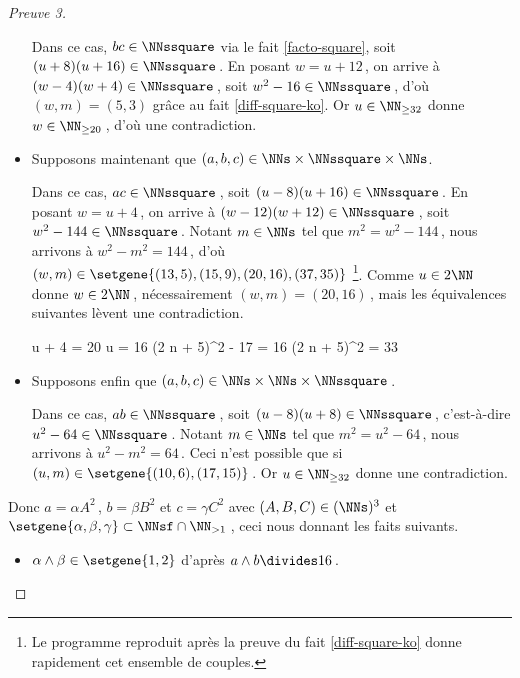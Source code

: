 \begin{proof}[Preuve 3]
\begin{itemize}
		\smallskip
		\noindent
		Dans ce cas, $bc \in \NNssquare$ via le fait \ref{facto-square}, soit $(u + 8) (u + 16) \in \NNssquare$\,.
		En posant $w = u + 12$\,, on arrive à $(w - 4) (w + 4) \in \NNssquare$\,, soit $w^2 - 16 \in \NNssquare$\,, d'où $(w, m) = (5, 3)$ grâce au fait \ref{diff-square-ko}.
		Or $u \in \NN_{\geq 32}$ donne $w \in \NN_{\geq 20}$\,, d'où une contradiction.

		
		\medskip
		\item Supposons maintenant que $(a, b, c) \in \NNs \times \NNssquare \times \NNs$. 
		
		\smallskip
		\noindent
		Dans ce cas, $ac \in \NNssquare$\,, soit $(u - 8) (u + 16) \in \NNssquare$\,.
		En posant $w = u + 4$\,, on arrive à $(w - 12) (w + 12) \in \NNssquare$\,, soit $w^2 - 144 \in \NNssquare$\,.
		Notant $m \in \NNs$ tel que $m^2 = w^2 - 144$\,, nous arrivons à $w^2 - m^2 = 144$\,, d'où $(w, m) \in \setgene{(13, 5) , (15, 9) , (20, 16) , (37, 35)}$
		\footnote{
			Le programme reproduit après la preuve du fait \ref{diff-square-ko} donne rapidement cet ensemble de couples.
		}.
		Comme $u \in 2 \NN$ donne $w \in 2 \NN$\,, nécessairement $(w, m) = (20, 16)$\,, mais les équivalences suivantes lèvent une contradiction.

		\noindent\!\!%
   		\begin{stepcalc}[style = sar, ope = \iff]
			u + 4 = 20
		\explnext{}
			u = 16
		\explnext{}
			(2 n + 5)^2 - 17 = 16
		\explnext*{$33 \notin \NNsquare$}{}
			(2 n + 5)^2 = 33
		\end{stepcalc}	
		
		
		\medskip
		\item Supposons enfin que $(a, b, c) \in \NNs \times \NNs \times \NNssquare$\,. 
		
		\smallskip
		\noindent
		Dans ce cas, $ab \in \NNssquare$\,, soit $(u - 8) (u + 8) \in \NNssquare$\,, c'est-à-dire $u^2 - 64 \in \NNssquare$\,.
		Notant $m \in \NNs$ tel que $m^2 = u^2 - 64$\,, nous arrivons à $u^2 - m^2 = 64$\,.
		Ceci n'est possible que si $(u, m) \in \setgene{(10, 6), (17, 15)}$\,.
		Or $u \in \NN_{\geq 32}$ donne une contradiction.
	\end{itemize}

	\medskip

	Donc 
	$a = \alpha A^2$\,, $b = \beta B^2$ et $c = \gamma C^2$ 
	avec $(A, B, C) \in ( \NNs )^3$
	et
	$\setgene{\alpha, \beta, \gamma} \subset \NNsf \cap \NN_{>1}$\,,
	ceci nous donnant les faits suivants.
    
    \begin{itemize}
		\item $\alpha \wedge \beta \in \setgene{1, 2}$
		d'après $a \wedge b \divides 16$\,.


\end{itemize}
\end{proof}
